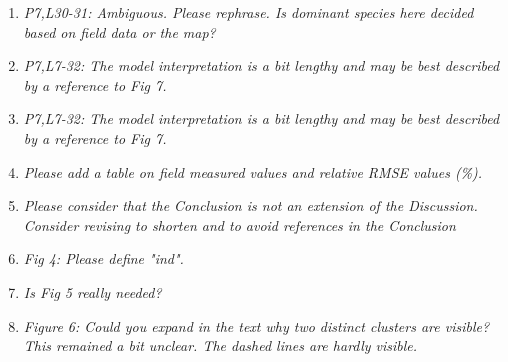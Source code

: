 \documentclass{article}
\begin{document}
\begin{enumerate}
  \answer{}
  
  \item \textit{P7,L30-31: Ambiguous. Please rephrase. Is dominant species here decided based on field data or the map?}
  
  \answer{}
  
  
  \item \textit{P7,L7-32: The model interpretation is a bit lengthy and may be best described by a reference to Fig 7.}
  
  
  \answer{}
  
  
  \item \textit{P7,L7-32: The model interpretation is a bit lengthy and may be best described by a reference to Fig 7.}
  
   \answer{}
  
  \item \textit{Please add a table on field measured values and relative RMSE values (\%).}
  
  \answer{}
  
  
  \item \textit{Please consider that the Conclusion is not an extension of the Discussion. Consider revising to shorten and to avoid references in the Conclusion}
  
    \answer{}
  
  
  \item \textit{Fig 4: Please define "ind".}
  
      \answer{}
  
  
  \item \textit{Is Fig 5 really needed?}
  
   \answer{}
  
  
  \item \textit{Figure 6: Could you expand in the text why two distinct clusters are visible? This remained a bit unclear. The dashed lines are hardly visible.}
  
     \answer{}
  

\end{enumerate}
\end{document}
